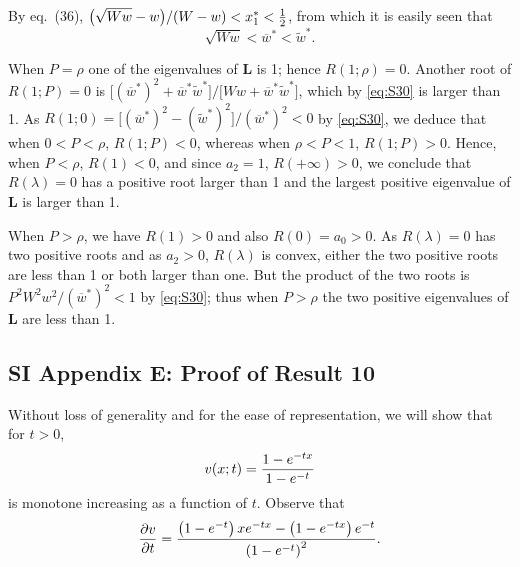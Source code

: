 \documentclass[9pt, a4paper]{extarticle}
\newcommand{\cl}{\mathbf{L}}
\begin{document}
By eq.~(36), $\bigl(\sqrt{Ww}-w\bigr)/(W-w) <x_1^* <{1\over 2}$, from which it is easily seen that
  \begin{equation} \label{eq:S30}
\sqrt{Ww}< \overline w^*<\widetilde w^* .
\end{equation}

 When $P=\rho$ one of the eigenvalues of $\cl$ is 1; hence $R(1;\rho)=0$. Another root of $R(1;P)=0$ is $\bigl[(\overline w^*)^2 +\overline w^*\widetilde w^*\bigr]/\bigl[Ww +\overline w^*\widetilde w^*\bigr]$, which by \eqref{eq:S30} is larger than 1.  As $R(1;0)=\bigl[(\overline w^*)^2 -(\widetilde w^*)^2\bigr]/(\overline w^*)^2 <0$ by \eqref{eq:S30}, we deduce that when $0<P<\rho$, $R(1;P)<0$, whereas when $\rho<P<1$, $R(1;P)>0$.
 Hence, when $P<\rho$, $R(1)<0$, and since $a_2=1$, $R(+\infty)>0$, we conclude that $R(\lambda)=0$ has a positive root larger than 1 and the largest positive eigenvalue of $\cl$ is larger than 1.
 
 When $P>\rho$, we have $R(1)>0$ and also $R(0)=a_0>0$. As $R(\lambda)=0$ has two positive roots and as $a_2>0$, $R(\lambda)$ is convex, either the two positive roots are less than 1 or both larger than one. But the product of the two roots is $P^2W^2w^2/(\overline w^*)^2<1$ by \eqref{eq:S30}; thus when $P>\rho$ the two positive eigenvalues of $\cl$ are less than 1.

\subsection*{SI Appendix E: Proof of Result 10}

Without loss of generality and for the ease of representation, we will show that for $t>0$, 
\begin{equation}
	v (x;t) ={1-e^{-tx}\over 1-e^{-t}}
\end{equation}
  is monotone increasing as a function of $t$. Observe that
  \begin{equation}
  {\partial v\over\partial t} = {\left(1-e^{-t}\right)xe^{-tx} -\left(1-e^{-tx}\right)e^{-t}\over \left(1-e^{-t}\right)^2}.
  \end{equation}
  
\end{document}
